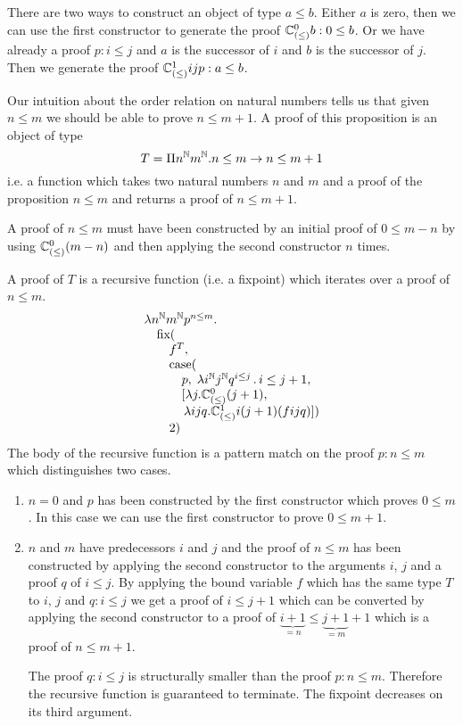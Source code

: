 There are two ways to construct an object of type $a \le b$. Either $a$ is
zero, then we can use the first constructor to generate the proof
$\mathbb{C}^0_{(\le)} b: 0 \le b$. Or we have already a proof $p: i \le j$
and $a$ is the successor of $i$ and $b$ is the successor of $j$. Then we
generate the proof $\mathbb{C}^1_{(\le)} i j p: a \le b$.

Our intuition about the order relation on natural numbers tells us that given
$n \le m$ we should be able to prove $n \le m + 1$. A proof of this
proposition is an object of type
$$
%
T = \Pi n^\Natural m^\Natural. n \le m \to n \le m + 1
$$
%
i.e. a function which takes two natural numbers $n$ and $m$ and a proof of the
proposition $n \le m$ and returns a proof of $n \le m + 1$.

A proof of $n \le m$ must have been constructed by an initial proof of $0 \le
m - n$ by using $\mathbb{C}^0_{(\le)} (m - n)$ and then applying the second
constructor $n$ times.

A proof of $T$ is a recursive function (i.e. a fixpoint) which iterates over a
proof of $n \le m$.
%
$$
\begin{array}{l}
  \lambda n^{\mathbb{N}} m^{\mathbb{N}} p^{n \le m}.
  \\
  \quad\text{fix}(
  \\
  \quad\quad f^T,
  \\
  \quad\quad \text{case} (
  \\
  \quad\quad\quad
    p, \;
    \lambda i^{\mathbb{N}} j^{\mathbb{N}} q^{i \le j}\,.\, i \le j+1,
  \\
  \quad\quad\quad [
  \lambda j. \mathbb{C}^0_{(\le)} (j+1),
  \\
  \quad\quad\quad\,
  \lambda i j q. \mathbb{C}^1_{(\le)} i (j+1) (f i j q)])
  \\
  \quad\quad 2)
\end{array}
$$
The body of the recursive function is a pattern match on the proof $p: n \le
m$ which distinguishes two cases.
\begin{enumerate}
\item $n = 0$ and $p$ has been constructed by the first constructor which
  proves $0 \le m$. In this case we can use the first constructor to prove $0
  \le m + 1$.

\item $n$ and $m$ have predecessors $i$ and $j$ and the proof of $n \le m$ has
  been constructed by applying the second constructor to the arguments $i$,
  $j$ and a proof $q$ of $i \le j$. By applying the bound variable $f$ which
  has the same type $T$ to $i$, $j$ and $q:i \le j$ we get a proof of
  $i \le j + 1$ which can be converted by applying the second constructor to a
  proof of $\underbrace{i + 1}_{= n} \le \underbrace{j + 1}_{=m} + 1$ which is
  a proof of $n \le m + 1$.

  The proof $q:i \le j$ is structurally smaller than the proof $p: n \le
  m$. Therefore the recursive function is guaranteed to terminate. The
  fixpoint decreases on its third argument.
\end{enumerate}

